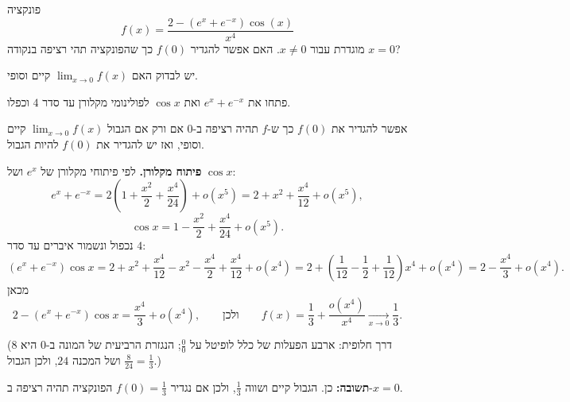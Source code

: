 
\begin{question}
פונקציה
\[
f(x)=\frac{2-(e^x+e^{-x})\cos(x)}{x^4}
\]
מוגדרת עבור $x\neq0$. האם אפשר להגדיר $f(0)$ כך שהפונקציה תהי רציפה בנקודה $x=0$?
\end{question}

\begin{hint}
יש לבדוק האם $\lim_{x\to0}f(x)$ קיים וסופי.
\end{hint}

\begin{hint}
פתחו את $e^x+e^{-x}$ ואת $\cos x$ לפולינומי מקלורן עד סדר $4$ וכפלו.
\end{hint}

\begin{solution}
אפשר להגדיר את $f(0)$ כך ש-$f$ תהיה רציפה ב-$0$ אם ורק אם הגבול $\lim_{x\to0}f(x)$ קיים וסופי, ואז יש להגדיר את $f(0)$ להיות הגבול.

\textbf{פיתוח מקלורן.} לפי פיתוחי מקלורן של $e^x$ ושל $\cos x$:
\[
e^x+e^{-x}=2\left(1+\frac{x^2}{2}+\frac{x^4}{24}\right)+o(x^5)=2+x^2+\frac{x^4}{12}+o(x^5),
\]
\[
\cos x=1-\frac{x^2}{2}+\frac{x^4}{24}+o(x^5).
\]
נכפול ונשמור איברים עד סדר $4$:
\[
(e^x+e^{-x})\cos x=2+x^2+\frac{x^4}{12}-x^2-\frac{x^4}{2}+\frac{x^4}{12}+o(x^4)
=2+\left(\frac{1}{12}-\frac12+\frac1{12}\right)x^4+o(x^4)=2-\frac{x^4}{3}+o(x^4).
\]
מכאן
\[
2-(e^x+e^{-x})\cos x=\frac{x^4}{3}+o(x^4),
\qquad\text{ולכן}\qquad
f(x)=\frac13+\frac{o(x^4)}{x^4}\xrightarrow[x\to0]{}\frac13.
\]

(דרך חלופית: ארבע הפעלות של כלל לופיטל על $\frac{0}{0}$; הנגזרת הרביעית של המונה ב-$0$ היא $8$ ושל המכנה $24$, ולכן הגבול $\frac{8}{24}=\frac13$.)

\textbf{תשובה:} כן. הגבול קיים ושווה $\frac13$, ולכן אם נגדיר $f(0)=\frac13$ הפונקציה תהיה רציפה ב-$x=0$.
\end{solution}
